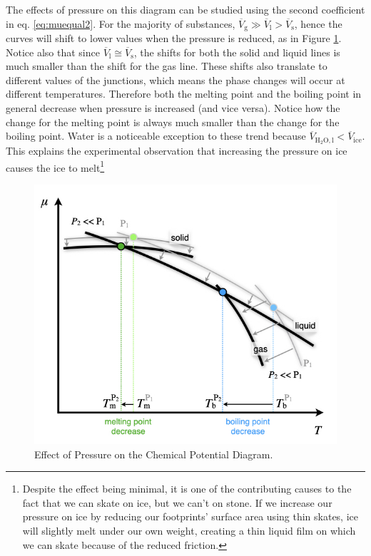 \documentclass[
  9pt,
]{extbook}
\theoremstyle{definition}
\theoremstyle{definition}
\theoremstyle{definition}
\theoremstyle{remark}
\begin{document}
The effects of pressure on this diagram can be studied using the second coefficient in eq. \eqref{eq:muequal2}. For the majority of substances, \(\overline{V}_{\text{g}} \gg \overline{V}_{\text{l}} > \overline{V}_{\text{s}}\), hence the curves will shift to lower values when the pressure is reduced, as in Figure \ref{fig:FigPhase2}. Notice also that since \(\overline{V}_{\text{l}} \cong \overline{V}_{\text{s}}\), the shifts for both the solid and liquid lines is much smaller than the shift for the gas line. These shifts also translate to different values of the junctions, which means the phase changes will occur at different temperatures. Therefore both the melting point and the boiling point in general decrease when pressure is increased (and vice versa). Notice how the change for the melting point is always much smaller than the change for the boiling point.
Water is a noticeable exception to these trend because \(\overline{V}_{\mathrm{H}_2\mathrm{O,l}} < \overline{V}_{\text{ice}}\). This explains the experimental observation that increasing the pressure on ice causes the ice to melt\footnote{Despite the effect being minimal, it is one of the contributing causes to the fact that we can skate on ice, but we can't on stone. If we increase our pressure on ice by reducing our footprints' surface area using thin skates, ice will slightly melt under our own weight, creating a thin liquid film on which we can skate because of the reduced friction.}

\begin{figure}

{\centering \includegraphics[width=0.6\linewidth]{./img/OEP_Figures.017} 

}

\caption{Effect of Pressure on the Chemical Potential Diagram.}\label{fig:FigPhase2}
\end{figure}
\end{document}
